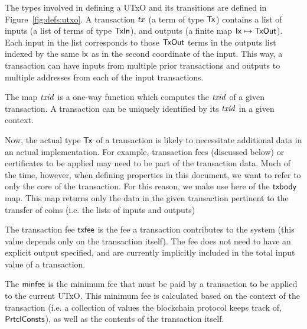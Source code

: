 \documentclass[11pt,a4paper]{article}
\newcommand{\Tx}{\type{Tx}}
\newcommand{\Ix}{\type{Ix}}
\newcommand{\PrtclConsts}{\type{PrtclConsts}}
\newcommand{\TxIn}{\type{TxIn}}
\newcommand{\TxOut}{\type{TxOut}}
\theoremstyle{definition}
\theoremstyle{definition}
\begin{document}
The types involved in defining a UTxO and its transitions are defined in
Figure~\ref{fig:defs:utxo}. A transaction $\mathit{tx}$ (a term of type $\Tx$)
contains a list of inputs (a list of terms of type $\TxIn$), and outputs
(a finite map $\Ix \mapsto \TxOut$). Each input in the list
corresponds to those $\TxOut$ terms in the outputs list indexed by the same
$\Ix$ as in the second coordinate of the input. This way, a transaction can have
inputs from multiple prior transactions and outputs to multiple addresses
from each of the input transactions.

The map $\mathit{txid}$ is a one-way function which computes the $\mathit{txid}$
of a given transaction. A transaction can be uniquely identified
by its $\mathit{txid}$ in a given context.

Now, the actual type $\Tx$ of a transaction is likely to necessitate additional data
in an actual implementation. For example, transaction fees (discussed below)
or certificates to be applied
may need to be part of the transaction data. Much of the time, however, when defining
properties in this document, we want to refer to only the core of the transaction.
For this reason, we make use here
of the $\mathsf{txbody}$ map. This map returns only the data in the given
transaction pertinent to the transfer of coins (i.e. the lists of inputs and outputs)

The transaction fee $\mathsf{txfee}$ is the
fee a transaction contributes to the system (this value depends only on
the transaction itself). The fee does not need to have an explicit output
specified, and are currently implicitly included in the total input value of
a transaction.

The $\mathsf{minfee}$ is the minimum
fee that must be paid by a transaction to be applied to the current UTxO.
This minimum fee
is calculated based on the context of the transaction (i.e. a collection of
values the blockchain protocol keeps track of, $\PrtclConsts$), as well as
the contents of the transaction itself.
\end{document}
